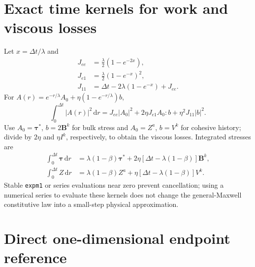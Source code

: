 \documentclass[11pt,a4paper]{article}
\newcommand{\tauv}{\bm\tau}
\newcommand{\dd}{\,\mathrm d}
\begin{document}
\section{Exact time kernels for work and viscous losses}

Let $x=\Delta t/\lambda$ and
\begin{align}
 J_{ee}&=\frac\lambda2(1-e^{-2x}),\\
 J_{e1}&=\frac\lambda2(1-e^{-x})^2,\\
 J_{11}&=\Delta t-2\lambda(1-e^{-x})+J_{ee}.
\end{align}
For $A(r)=e^{-r/\lambda}A_0+\eta(1-e^{-r/\lambda})b$,
\begin{equation}
 \int_0^{\Delta t}|A(r)|^2\dd r
 =J_{ee}|A_0|^2+2\eta J_{e1}A_0:b+\eta^2J_{11}|b|^2.
\end{equation}
Use $A_0=\tauv^*$, $b=2\bm B^k$ for bulk stress and $A_0=Z^a$, $b=V^k$
for cohesive history; divide by $2\eta$ and $\eta I^k$, respectively, to obtain
the viscous losses. Integrated stresses are
\begin{align}
 \int_0^{\Delta t}\tauv\dd r
   &=\lambda(1-\beta)\tauv^*
      +2\eta[\Delta t-\lambda(1-\beta)]\bm B^k,\\
 \int_0^{\Delta t}Z\dd r
   &=\lambda(1-\beta)Z^a
      +\eta[\Delta t-\lambda(1-\beta)]V^k.
\end{align}
Stable \texttt{expm1} or series evaluations near zero prevent cancellation;
using a numerical series to evaluate these kernels does not change the
general-Maxwell constitutive law into a small-step physical approximation.

\section{Direct one-dimensional endpoint reference}
\end{document}
